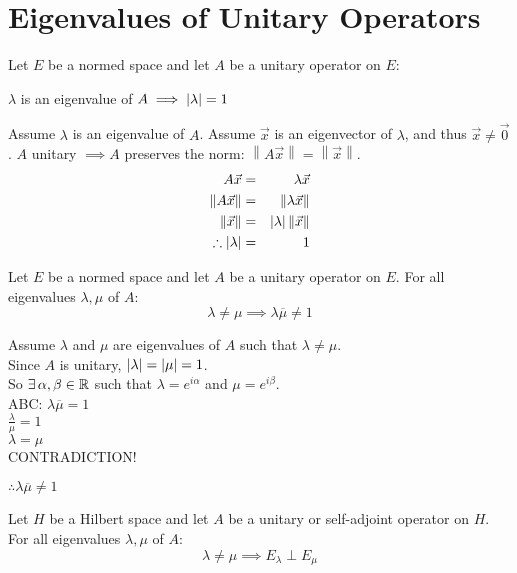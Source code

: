 \documentclass[letterpaper,12pt,fleqn]{article}
\renewcommand{\a}{\alpha}
\renewcommand{\b}{\beta}
\renewcommand{\l}{\lambda}
\newcommand{\m}{\mu}
\newcommand{\norm}[1]{\left\|#1\right\|}
\newcommand{\conj}[1]{\overline{#1}}
\newcommand{\vx}{\vec{x}}
\newcommand{\vo}{\vec{0}}
\begin{document}
\section*{Eigenvalues of Unitary Operators}

\begin{theorem}
  Let $E$ be a normed space and let $A$ be a unitary operator on $E$:

  \qquad$\l$ is an eigenvalue of $A\implies\abs{\l}=1$
\end{theorem}

\begin{theproof}
  Assume $\l$ is an eigenvalue of $A$.
  Assume $\vx$ is an eigenvector of $\l$, and thus $\vx\ne\vo$.
  $A$ unitary $\implies A$ preserves the norm: $\norm{A\vx}=\norm{\vx}$.
  \begin{eqnarray*}
    A\vx &=& \l\vx \\
    \norm{A\vx} &=& \norm{\l\vx} \\
    \norm{\vx} &=& \abs{\l}\norm{\vx} \\
    \therefore\abs{\l} &=& 1
  \end{eqnarray*}
\end{theproof}

\begin{lemma}
  Let $E$ be a normed space and let $A$ be a unitary operator on $E$. For
  all eigenvalues $\l,\m$ of $A$:
  \[\l\ne\mu\implies\l\conj{\m}\ne1\]
\end{lemma}

\begin{theproof}
  Assume $\l$ and $\m$ are eigenvalues of $A$ such that $\l\ne\m$. \\
  Since $A$ is unitary, $\abs{\l}=\abs{\mu}=1$. \\
  So $\exists\,\a,\b\in\R$ such that $\l=e^{i\a}$ and $\m=e^{i\b}$. \\
  ABC: $\l\conj{\m}=1$ \\
  $\frac{\l}{\m}=1$ \\
  $\l=\m$ \\
  CONTRADICTION!

  $\therefore\l\conj{\m}\ne1$
\end{theproof}

\begin{theorem}
  Let $H$ be a Hilbert space and let $A$ be a unitary or self-adjoint operator
  on $H$. For all eigenvalues $\l,\m$ of $A$:
  \[\l\ne\m\implies E_{\l}\perp E_{\m}\]
\end{theorem}
\end{document}
